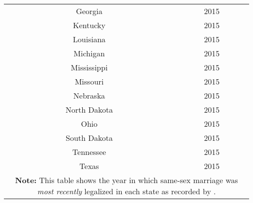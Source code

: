 \begin{longtable}{|c|c|}
Georgia & 2015 \\
Kentucky & 2015 \\
Louisiana & 2015 \\
Michigan & 2015 \\
Mississippi & 2015 \\
Missouri & 2015 \\
Nebraska & 2015 \\
North Dakota & 2015 \\
Ohio & 2015 \\
South Dakota & 2015 \\
Tennessee & 2015 \\
Texas & 2015 \\
\hline
\multicolumn{2}{p{0.8\linewidth}}{\small \textbf{Note:} This table shows the year in which same-sex marriage was \textit{most recently} legalized in each state as recorded by \citet{27}.} \\ 
\end{longtable}

